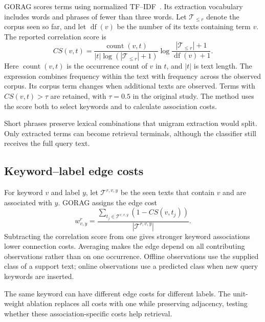 GORAG scores terms using normalized TF--IDF~\cite{gorag-tfidf}. Its extraction vocabulary includes words and phrases of fewer than three words. Let $\mathcal{T}_{\leq r}$ denote the corpus seen so far, and let $\operatorname{df}(v)$ be the number of its texts containing term $v$. The reported correlation score is
\begin{equation}
CS(v,t)=\frac{\operatorname{count}(v,t)}{|t|\log(|\mathcal{T}_{\leq r}|+1)}
\log\frac{|\mathcal{T}_{\leq r}|+1}{\operatorname{df}(v)+1}.
\label{eq:gorag:correlation}
\end{equation}
Here $\operatorname{count}(v,t)$ is the occurrence count of $v$ in $t$, and $|t|$ is text length. The expression combines frequency within the text with frequency across the observed corpus. Its corpus term changes when additional texts are observed. Terms with $CS(v,t)>\tau$ are retained, with $\tau=0.5$ in the original study. The method uses the score both to select keywords and to calculate association costs.

Short phrases preserve lexical combinations that unigram extraction would split. Only extracted terms can become retrieval terminals, although the classifier still receives the full query text.

\subsection{Keyword--label edge costs}
\label{sec:gorag:weights}

For keyword $v$ and label $y$, let $\mathcal{T}^{r,v,y}$ be the seen texts that contain $v$ and are associated with $y$. GORAG assigns the edge cost
\begin{equation}
w_{v,y}^r=\frac{\sum_{t_j\in\mathcal{T}^{r,v,y}}(1-CS(v,t_j))}{|\mathcal{T}^{r,v,y}|}.
\label{eq:gorag:weights}
\end{equation}
Subtracting the correlation score from one gives stronger keyword associations lower connection costs. Averaging makes the edge depend on all contributing observations rather than on one occurrence. Offline observations use the supplied class of a support text; online observations use a predicted class when new query keywords are inserted.

The same keyword can have different edge costs for different labels. The unit-weight ablation replaces all costs with one while preserving adjacency, testing whether these association-specific costs help retrieval.

